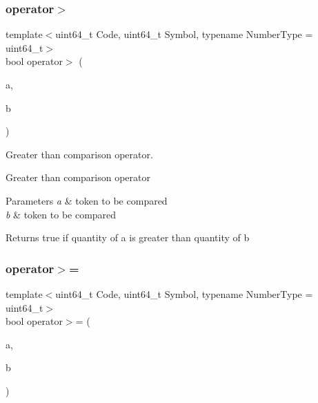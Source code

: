\subsubsection{\texorpdfstring{operator$>$}{operator>}}
{\footnotesize\ttfamily template$<$uint64\+\_\+t Code, uint64\+\_\+t Symbol, typename Number\+Type  = uint64\+\_\+t$>$ \\
bool operator$>$ (\begin{DoxyParamCaption}\item[{const \mbox{\hyperlink{classaacio_1_1token}{token}}$<$ Code, Symbol, Number\+Type $>$ \&}]{a,  }\item[{const \mbox{\hyperlink{classaacio_1_1token}{token}}$<$ Code, Symbol, Number\+Type $>$ \&}]{b }\end{DoxyParamCaption})\hspace{0.3cm}{\ttfamily [friend]}}



Greater than comparison operator. 

Greater than comparison operator 
\begin{DoxyParams}{Parameters}
{\em a} & token to be compared \\
\hline
{\em b} & token to be compared \\
\hline
\end{DoxyParams}
\begin{DoxyReturn}{Returns}
true if quantity of a is greater than quantity of b 
\end{DoxyReturn}
\mbox{\label{classaacio_1_1token_abf600f9ac9c421e3bf284577acd22547}} 
\subsubsection{\texorpdfstring{operator$>$=}{operator>=}}
{\footnotesize\ttfamily template$<$uint64\+\_\+t Code, uint64\+\_\+t Symbol, typename Number\+Type  = uint64\+\_\+t$>$ \\
bool operator$>$= (\begin{DoxyParamCaption}\item[{const \mbox{\hyperlink{classaacio_1_1token}{token}}$<$ Code, Symbol, Number\+Type $>$ \&}]{a,  }\item[{const \mbox{\hyperlink{classaacio_1_1token}{token}}$<$ Code, Symbol, Number\+Type $>$ \&}]{b }\end{DoxyParamCaption})\hspace{0.3cm}{\ttfamily [friend]}}




